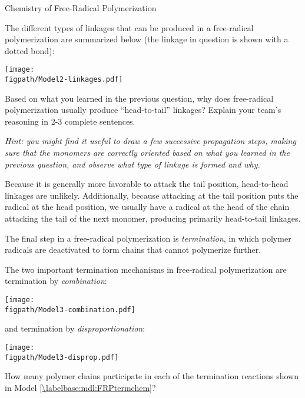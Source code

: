 \begin{activity}{Chemistry of Free-Radical Polymerization}
\begin{ctqs}
		\question The different types of linkages that can be produced in a free-radical polymerization are summarized below (the linkage in question is shown with a dotted bond):
	
			\centerline{\texttt{[image: \\figpath/Model2-linkages.pdf]}}
			
				Based on what you learned in the previous question, why does free-radical polymerization usually produce ``head-to-tail'' linkages?  Explain your team's reasoning in 2-3 complete sentences.
				
				\emph{Hint: you might find it useful to draw a few successive propagation steps, making sure that the monomers are correctly oriented based on what you learned in the previous question, and observe what type of linkage is formed and why.}
				
				\begin{solution}[3in]{}
					Because it is generally more favorable to attack the tail position, head-to-head linkages are unlikely.  Additionally, because attacking at the tail position puts the radical at the head position, we usually have a radical at the head of the chain attacking the tail of the next monomer, producing primarily head-to-tail linkages.
								
				\end{solution}
		
\end{ctqs}	

\begin{model}[Termination]
\label{\labelbase:mdl:FRPtermchem}

	The final step in a free-radical polymerization is \emph{termination}, in which polymer radicals are deactivated to form chains that cannot polymerize further.
	
	The two important termination mechanisms in free-radical polymerization are termination by \emph{combination}:
	
			\centerline{\texttt{[image: \\figpath/Model3-combination.pdf]}}
	
	and termination by \emph{disproportionation}:
	
			\centerline{\texttt{[image: \\figpath/Model3-disprop.pdf]}}

\end{model}

\begin{ctqs}

	\question How many polymer chains participate in each of the termination reactions shown in Model \ref{\labelbase:mdl:FRPtermchem}?
	

\end{ctqs}
\end{activity}
